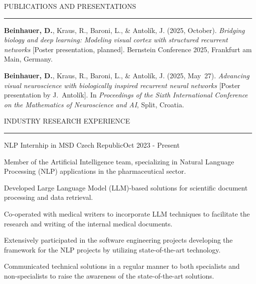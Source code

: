 \documentclass{resume} %
\renewenvironment{rSection}[1]{
\sectionskip
\textcolor{CarnegieMellonRed}{\MakeUppercase{#1}}
\sectionlineskip
\hrule
\begin{list}{}{
\setlength{\leftmargin}{1.5em}
}
\item[]
}{
\end{list}
}
\begin{document}

\begin{rSection}{Publications and Presentations}

\begin{enumerate}[leftmargin=*, label={[\arabic*]}] \itemsep -6pt

\item \textbf{Beinhauer, D.}, Kraus, R., Baroni, L., \& Antolík, J. (2025, October). 
\textit{Bridging biology and deep learning: Modeling visual cortex with structured recurrent networks} [Poster presentation, planned]. 
Bernstein Conference 2025, Frankfurt am Main, Germany.

\item \textbf{Beinhauer, D.}, Kraus, R., Baroni, L., \& Antolík, J. (2025, May~27). 
\textit{Advancing visual neuroscience with biologically inspired recurrent neural networks} [Poster presentation by J.~Antolík]. 
In \textit{Proceedings of the Sixth International Conference on the Mathematics of Neuroscience and AI}, Split, Croatia.

\end{enumerate}

\end{rSection}

\newpage



\begin{rSection}{Industry Research Experience}
\begin{rProject}{\large NLP Internhip in MSD Czech Republic}{Oct 2023 - Present}
{}{}
    \item Member of the Artificial Intelligence team, specializing in Natural Language Processing (NLP) applications in the pharmaceutical sector.
    \item Developed Large Language Model (LLM)-based solutions for scientific document processing and data retrieval.
    \item Co-operated with medical writers to incorporate LLM techniques to facilitate the research and writing of the internal medical documents.
    \item Extensively participated in the software engineering projects developing the framework for the NLP projects by utilizing state-of-the-art technology.
    \item Communicated technical solutions in a regular manner to both specialists and non-specialists to raise the awareness of the state-of-the-art solutions.
\end{rProject}

\end{rSection}
\end{document}

